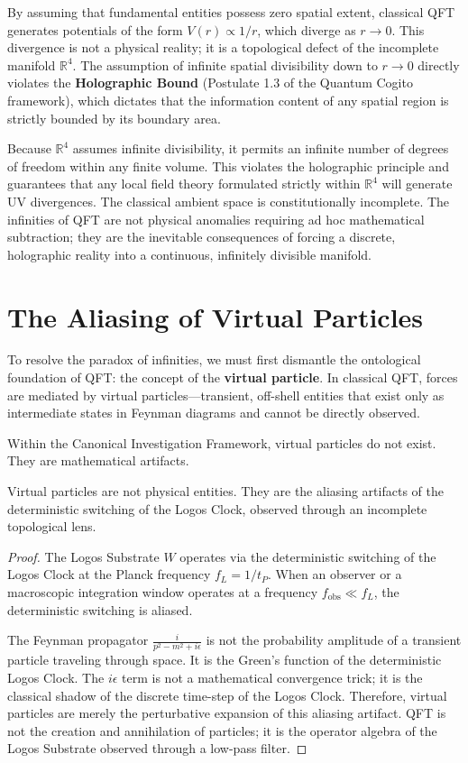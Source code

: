 \documentclass[12pt,twoside]{extbook}
\theoremstyle{definition}
\theoremstyle{remark}
\newcommand{\term}[1]{\textcolor{brandPrimary}{\textbf{#1}}}
\begin{document}
By assuming that fundamental entities possess zero spatial extent, classical QFT generates potentials of the form $V(r) \propto 1/r$, which diverge as $r \to 0$. This divergence is not a physical reality; it is a topological defect of the incomplete manifold $\mathbb{R}^4$. The assumption of infinite spatial divisibility down to $r \to 0$ directly violates the \term{Holographic Bound} (Postulate 1.3 of the Quantum Cogito framework), which dictates that the information content of any spatial region is strictly bounded by its boundary area. 

Because $\mathbb{R}^4$ assumes infinite divisibility, it permits an infinite number of degrees of freedom within any finite volume. This violates the holographic principle and guarantees that any local field theory formulated strictly within $\mathbb{R}^4$ will generate UV divergences. The classical ambient space is constitutionally incomplete. The infinities of QFT are not physical anomalies requiring ad hoc mathematical subtraction; they are the inevitable consequences of forcing a discrete, holographic reality into a continuous, infinitely divisible manifold.

\section{The Aliasing of Virtual Particles}
To resolve the paradox of infinities, we must first dismantle the ontological foundation of QFT: the concept of the \term{virtual particle}. In classical QFT, forces are mediated by virtual particles—transient, off-shell entities that exist only as intermediate states in Feynman diagrams and cannot be directly observed.

Within the Canonical Investigation Framework, virtual particles do not exist. They are mathematical artifacts.

\begin{theorem}
Virtual particles are not physical entities. They are the aliasing artifacts of the deterministic switching of the Logos Clock, observed through an incomplete topological lens.
\end{theorem}

\begin{proof}
The Logos Substrate $W$ operates via the deterministic switching of the Logos Clock at the Planck frequency $f_L = 1/t_P$. When an observer or a macroscopic integration window operates at a frequency $f_{\text{obs}} \ll f_L$, the deterministic switching is aliased. 

The Feynman propagator $\frac{i}{p^2 - m^2 + i\epsilon}$ is not the probability amplitude of a transient particle traveling through space. It is the Green's function of the deterministic Logos Clock. The $i\epsilon$ term is not a mathematical convergence trick; it is the classical shadow of the discrete time-step of the Logos Clock. Therefore, virtual particles are merely the perturbative expansion of this aliasing artifact. QFT is not the creation and annihilation of particles; it is the operator algebra of the Logos Substrate observed through a low-pass filter.
\end{proof}
\end{document}
